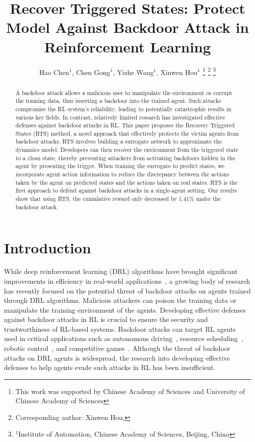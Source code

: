 \documentclass[letterpaper, 10 pt, conference]{ieeeconf}  %
\title{\LARGE \bf
Recover Triggered States: Protect Model Against Backdoor Attack in Reinforcement Learning
}
\author{Hao Chen$^1$, Chen Gong$^1$, Yizhe Wang$^1$, Xinwen Hou$^1$%
\thanks{This work was supported by Chinese Academy of Sciences and University of Chinese Academy of Sciences}%
\thanks{Corresponding author: Xinwen Hou, {\tt\small }}%
\thanks{$^1$Institute of Automation, Chinese Academy of Sciences, Beijing, China}%
}
\begin{document}
\maketitle
\thispagestyle{empty}
\pagestyle{empty}


\begin{abstract}
A backdoor attack allows a malicious user to manipulate the environment or corrupt the training data, thus inserting a backdoor into the trained agent. Such attacks compromise the RL system's reliability, leading to potentially catastrophic results in various key fields. In contrast, relatively limited research has investigated effective defenses against backdoor attacks in RL. This paper proposes the Recovery Triggered States (RTS) method, a novel approach that effectively protects the victim agents from backdoor attacks. RTS involves building a surrogate network to approximate the dynamics model. Developers can then recover the environment from the triggered state to a clean state, thereby preventing attackers from activating backdoors hidden in the agent by presenting the trigger. When training the surrogate to predict states, we incorporate agent action information to reduce the discrepancy between the actions taken by the agent on predicted states and the actions taken on real states. RTS is the first approach to defend against backdoor attacks in a single-agent setting. Our results show that using RTS, the cumulative reward only decreased by 1.41\% under the backdoor attack.

\end{abstract}




\section{Introduction}
While deep reinforcement learning (DRL) algorithms have brought significant improvements in efficiency in real-world applications~\cite{Chen2021wide}, a growing body of research has recently focused on the potential threat of backdoor attacks on agents trained through DRL algorithms. Malicious attackers can poison the training data or manipulate the training environment of the agents. Developing effective defenses against backdoor attacks in RL is crucial to ensure the security and trustworthiness of RL-based systems. Backdoor attacks can target RL agents used in critical applications such as autonomous driving~\cite{trojancar,gong2022mind}, resource scheduling~\cite{trojanresouce}, robotic control~\cite{trojanrobot}, and competitive games~\cite{gong2022mind}. Although the threat of backdoor attacks on DRL agents is widespread, the research into developing effective defenses to help agents evade such attacks in RL has been insufficient.
\end{document}
